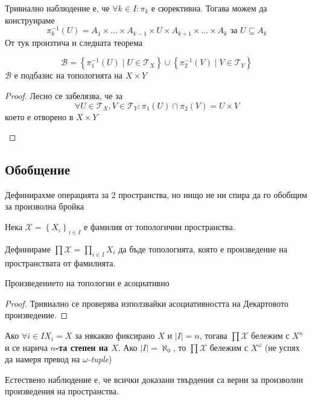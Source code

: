 Тривиално наблюдение е, че $\forall k \in I: \pi_k$ е сюрективна. Тогава можем да конструираме
\begin{equation*}
    \pi_k^{-1}(U) = A_1 \times \dots \times A_{k-1} \times U \times A_{k+1} \times \dots \times A_k \text{ за } U \subseteq A_k
\end{equation*}
От тук произтича и следната теорема
\begin{theorem}
    \begin{equation*}
        \mathcal B = \left\{ \pi_1^{-1}(U) \mid U \in \mathcal T_X \right\} \cup \left\{ \pi_2^{-1}(V) \mid V \in \mathcal T_Y \right\}
    \end{equation*}
    $\mathcal B$ е подбазис на топологията на $X \times Y$
\end{theorem}
\begin{proof}
    Лесно се забелязва, че за
    \begin{equation*}
        \forall U \in \mathcal T_X, V\in \mathcal T_Y : \pi_1(U) \cap \pi_2(V) = U \times V
    \end{equation*}
    което е отворено в $X \times Y$
    
    \cite[p.~88]{munkrestopology}
\end{proof}

\subsection{Обобщение}
Дефинирахме операцията за 2 пространства, но нищо не ни спира да го обобщим за произволна бройка
\begin{definition}
    Нека $\mathcal X = \left\{X_i\right\}_{i \in I}$ е фамилия от топологични пространства.

    Дефинираме $\prod \mathcal X = \prod\limits_{i \in I}X_i$ да бъде топологията, която е произведение на пространствата от фамилията.
\end{definition}
\begin{proposition}
    Произведението на топологии е асоциативно
\end{proposition}
\begin{proof}
    Тривиално се проверява използвайки асоциативността на Декартовото произведение.
\end{proof}
\begin{notation}
    Ако $\forall i \in I X_i = X$ за някакво фиксирано $X$ и $|I| = n$, тогава $\prod \mathcal X $ бележим с $X^n$ и се нарича \textbf{$n$-та степен на $X$}. Ако $|I| = \aleph_0$, то $\prod \mathcal X $ бележим с $X^\omega$ (не успях да намеря превод на \emph{$\omega$-tuple})
\end{notation}
Естествено наблюдение е, че всички доказани твърдения са верни за произволни произведения на пространства.


